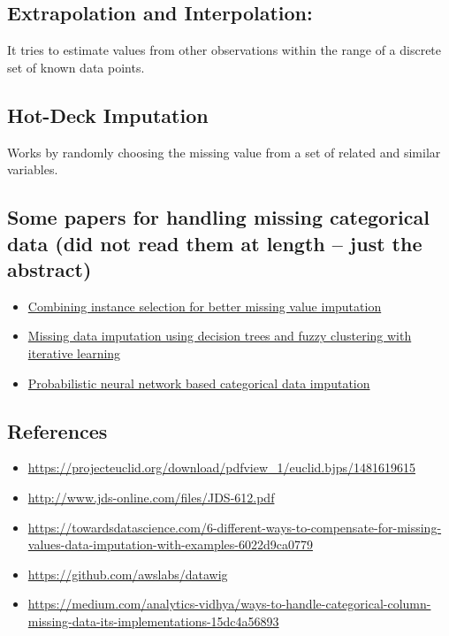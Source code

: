 \documentclass{article}
\begin{document}
\subsection{Extrapolation and Interpolation:}
It tries to estimate values from other observations within the range of a discrete set of known data points.

\subsection{Hot-Deck Imputation}
Works by randomly choosing the missing value from a set of related and similar variables.

\subsection{Some papers for handling missing categorical data (did not read them at length -- just the abstract)}

\begin{itemize}
\item \href{https://www.sciencedirect.com/science/article/abs/pii/S0164121216301583?casa_token=ZELiCdTNfw4AAAAA:_dpjT3fvcxOkRXX1po7HaCnzb02biPjrKEYw-j8d7OU_krEYFqaaQIIwQo3rki5tbUWitsJstA}{Combining instance selection for better missing value imputation}
\item \href{https://link.springer.com/article/10.1007/s10115-019-01427-1}{Missing data imputation using decision trees and fuzzy clustering with iterative learning}
\item \href{https://www.sciencedirect.com/science/article/abs/pii/S0925231216309407?casa_token=dC_ROkr-pWoAAAAA:s5zwIWUilFRt2zbv5YcFVu6kzsNhdZN3c_OfUpQ1s1e-f9-c4VqcB1_OnXS-kGF0-kPzctFJ9A}{Probabilistic neural network based categorical data imputation}
\end{itemize}

\subsection*{References}
\begin{itemize}
\item \url{https://projecteuclid.org/download/pdfview_1/euclid.bjps/1481619615}

\item \url{http://www.jds-online.com/files/JDS-612.pdf}

\item\url{ https://towardsdatascience.com/6-different-ways-to-compensate-for-missing-values-data-imputation-with-examples-6022d9ca0779}
\item \url{https://github.com/awslabs/datawig}
\item \url{https://medium.com/analytics-vidhya/ways-to-handle-categorical-column-missing-data-its-implementations-15dc4a56893}
\end{itemize}
\end{document}
